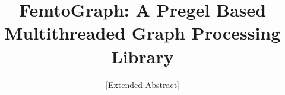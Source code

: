 \documentclass{sig-alternate-05-2015}
\begin{document}





%

\title{FemtoGraph: A Pregel Based Multithreaded Graph Processing Library}
\subtitle{[Extended Abstract]}
%
%
%
%
%
\end{document}

